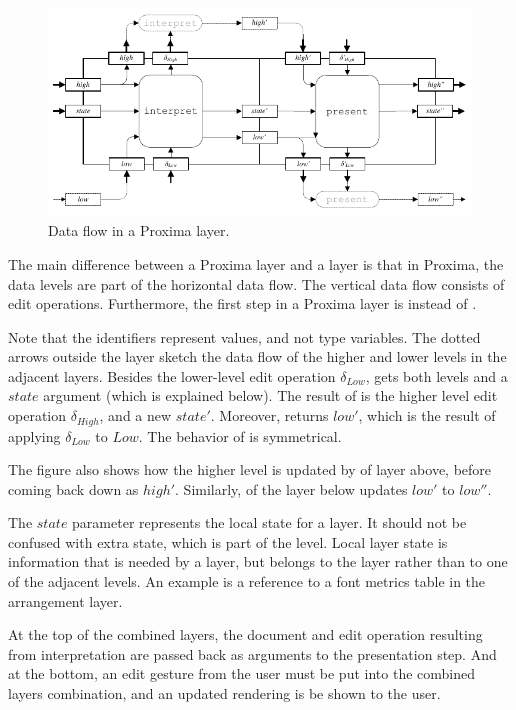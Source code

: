 \documentclass{llncs}
\begin{document}
\begin{figure}
\includegraphics[width=\columnwidth]{images/LayerDataFlow}
\caption{Data flow in a Proxima layer.} \label{proximaDataFlow}
\end{figure}



\bc
The main difference between a Proxima layer and a  layer is that in Proxima, the data levels are part of the horizontal data flow. The vertical data flow consists of edit operations. Furthermore, the first step in a Proxima layer is  instead of .

Note that the identifiers represent values, and not type variables. The dotted arrows outside the layer sketch the data flow of the higher and lower levels in the adjacent layers. Besides the lower-level edit operation $\delta_{Low}$,  gets both levels and a $state$ argument (which is explained below). The result of  is the higher level edit operation $\delta_{High}$, and a new $state'$. Moreover,  returns $low'$, which is the result of applying $\delta_{Low}$ to $Low$. The behavior of  is symmetrical.

The figure also shows how the higher level is updated by  of layer above, before coming back down as $high'$. Similarly,  of the layer below updates $low'$ to $low''$. 

The $state$ parameter represents the local state for a layer. It should not be confused with extra state, which is part of the level. Local layer state is information that is needed by a layer, but belongs to the layer rather than to one of the adjacent levels. An example is a reference to a font metrics table in the arrangement layer.

At the top of the combined layers, the document and edit operation resulting from interpretation are passed back as arguments to the presentation step. And at the bottom, an edit gesture from the user must be put into the combined layers combination, and an updated rendering is be shown to the user. 
\ec
\end{document}
